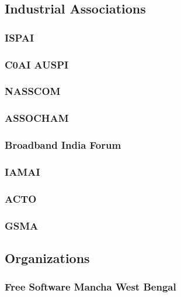 \documentclass{article}
\begin{document}
\subsection{Industrial Associations}
\subsubsection{ISPAI}


\subsubsection{C0AI AUSPI}


\subsubsection{NASSCOM}


\subsubsection{ASSOCHAM}


\subsubsection{Broadband India Forum}


\subsubsection{IAMAI}


\subsubsection{ACTO}


\subsubsection{GSMA}



\subsection{Organizations}
\subsubsection{Free Software Mancha West Bengal}

\end{document}

